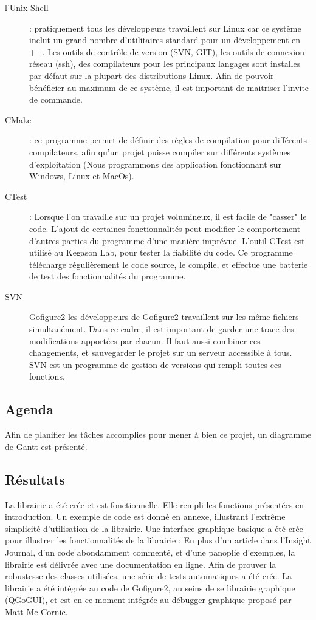 \begin{description}
  \item[l'Unix Shell] : pratiquement tous les développeurs travaillent sur Linux car ce système inclut un grand nombre d'utilitaires
  standard pour un développement en {\C++}. Les outils de contrôle de version (SVN, GIT), les outils de connexion réseau (ssh), des
  compilateurs pour les principaux langages sont installes par défaut sur la plupart des distributions Linux.
  Afin de pouvoir bénéficier au maximum de ce système, il est important de maitriser l'invite de commande.
  \item[CMake] : ce programme permet de définir des règles de compilation pour différents compilateurs, afin qu'un projet puisse
   compiler sur différents systèmes d'exploitation (Nous programmons des application fonctionnant sur Windows, Linux et MacOs).
  \item[CTest] : Lorsque l'on travaille sur un projet volumineux, il est facile de "casser" le code. L'ajout de certaines fonctionnalités 
  peut modifier le comportement d'autres parties du programme d'une manière imprévue. L'outil CTest est utilisé au Kegason Lab, 
  pour tester la fiabilité du code. Ce programme télécharge régulièrement le code source, le compile, et effectue une batterie de test 
  des fonctionnalités du programme.
  \item[SVN] Gofigure2 les développeurs de Gofigure2 travaillent sur les même fichiers simultanément. 
  Dans ce cadre, il est important de garder une trace des modifications apportées par chacun. Il faut aussi combiner ces changements, 
  et sauvegarder le projet sur un serveur accessible à tous. SVN est un programme de gestion de versions qui rempli toutes ces 
  fonctions.
\end{description}


\subsection{Agenda}

Afin de planifier les tâches accomplies pour mener à bien ce projet, un diagramme de Gantt est présenté.

\subsection{Résultats}

La librairie a été crée et est fonctionnelle. Elle rempli les fonctions présentées en introduction. Un exemple de code est donné en annexe, illustrant l'extrême simplicité d'utilisation de la librairie.
Une interface graphique basique a été crée pour illustrer les fonctionnalités de la librairie :
En plus d'un article dans l'Insight Journal, d'un code abondamment commenté, et d'une panoplie d'exemples, la librairie est délivrée avec une documentation en ligne.
Afin de prouver la robustesse des classes utilisées, une série de tests automatiques a été crée.
La librairie a été intégrée au code de Gofigure2, au seins de se librairie graphique (QGoGUI), et est en ce moment intégrée au débugger graphique proposé par Matt Mc Cornic.


